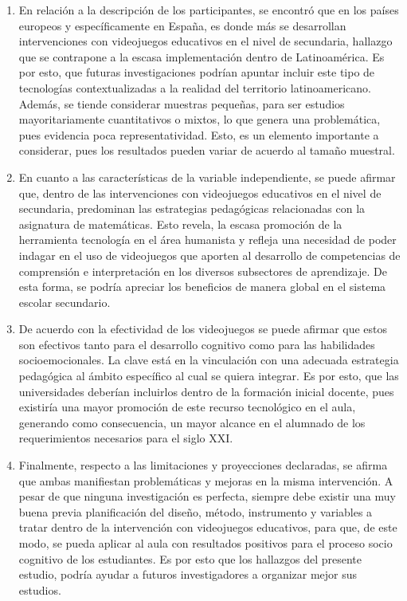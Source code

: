 \documentclass[spanish]{textolivre}
\begin{document}
\begin{enumerate}
    \item En relación a la descripción de los participantes, se encontró que en los países europeos y específicamente en España, es donde más se desarrollan intervenciones con videojuegos educativos en el nivel de secundaria, hallazgo que se contrapone a la escasa implementación dentro de Latinoamérica. Es por esto, que futuras investigaciones podrían apuntar incluir este tipo de tecnologías contextualizadas a la realidad del territorio latinoamericano. Además, se tiende considerar muestras pequeñas, para ser estudios mayoritariamente cuantitativos o mixtos, lo que genera una problemática, pues evidencia poca representatividad. Esto, es un elemento importante a considerar, pues los resultados pueden variar de acuerdo al tamaño muestral.
    \item En cuanto a las características de la variable independiente, se puede afirmar que, dentro de las intervenciones con videojuegos educativos en el nivel de secundaria, predominan las estrategias pedagógicas relacionadas con la asignatura de matemáticas. Esto revela, la escasa promoción de la herramienta tecnología en el área humanista y refleja una necesidad de poder indagar en el uso de videojuegos que aporten al desarrollo de competencias de comprensión e interpretación en los diversos subsectores de aprendizaje. De esta forma, se podría apreciar los beneficios de manera global en el sistema escolar secundario.
    \item De acuerdo con la efectividad de los videojuegos se puede afirmar que estos son efectivos tanto para el desarrollo cognitivo como para las habilidades socioemocionales. La clave está en la vinculación con una adecuada estrategia pedagógica al ámbito específico al cual se quiera integrar. Es por esto, que las universidades deberían incluirlos dentro de la formación inicial docente, pues existiría una mayor promoción de este recurso tecnológico en el aula, generando como consecuencia, un mayor alcance en el alumnado de los requerimientos necesarios para el siglo XXI.
    \item Finalmente, respecto a las limitaciones y proyecciones declaradas, se afirma que ambas manifiestan problemáticas y mejoras en la misma intervención. A pesar de que ninguna investigación es perfecta, siempre debe existir una muy buena previa planificación del diseño, método, instrumento y variables a tratar dentro de la intervención con videojuegos educativos, para que, de este modo, se pueda aplicar al aula con resultados positivos para el proceso socio cognitivo de los estudiantes. Es por esto que los hallazgos del presente estudio, podría ayudar a futuros investigadores a organizar mejor sus estudios.
\end{enumerate}
\end{document}
